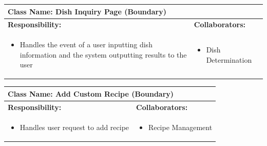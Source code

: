 \documentclass[]{article}
\begin{document}
\begin{table}[H]
	\centering
	\begin{tabular}{|p{7cm}|p{7cm}|}
	\hline 
	 \multicolumn{2}{|l|}{\textbf{Class Name:} Dish Inquiry Page (Boundary)} \\
	\hline
	\textbf{Responsibility:} & \textbf{Collaborators:} \\
	\hline
	\raggedright
	\begin{itemize}
		\item Handles the event of a user inputting dish information and the system outputting results to the user
	\end{itemize}
	\vspace{1in} & 
	\begin{itemize}
		\item Dish Determination
	\end{itemize} \\
	\hline
	\end{tabular}
\end{table}

\begin{table}[H]
	\centering
	\begin{tabular}{|p{7cm}|p{7cm}|}
	\hline 
	 \multicolumn{2}{|l|}{\textbf{Class Name:} Add Custom Recipe (Boundary)} \\
	\hline
	\textbf{Responsibility:} & \textbf{Collaborators:} \\
	\hline
	\raggedright
	\begin{itemize}
		\item Handles user request to add recipe
	\end{itemize}
	\vspace{1in} & 
	\begin{itemize}
		\item Recipe Management
	\end{itemize} \\
	\hline
	\end{tabular}
\end{table}

\end{document}
